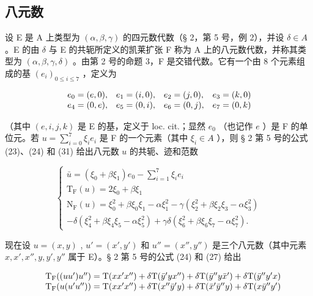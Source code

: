 \subsection{八元数}

设 E 是 A 上类型为 \((\alpha, \beta, \gamma)\) 的四元数代数（§ 2，第 5 号，例 2），并设 \(\delta \in A\) 。E 的由 \(\delta\) 与 E 的共轭所定义的凯莱扩张 F 称为 A 上的八元数代数，并称其类型为 \((\alpha, \beta, \gamma, \delta)\) 。由第 2 号的命题 3，F 是交错代数。它有一个由 8 个元素组成的基 \((e_{i})_{0 \leq i \leq 7}\) ，定义为

\[
\begin{array}{l l l l} e _ {0} = (e, 0), & e _ {1} = (i, 0), & e _ {2} = (j, 0), & e _ {3} = (k, 0) \\ e _ {4} = (0, e), & e _ {5} = (0, i), & e _ {6} = (0, j), & e _ {7} = (0, k) \end{array}
\]

（其中 \((e, i, j, k)\) 是 E 的基，定义于 loc. cit.；显然 \(e_0\) （也记作 \(e\) ）是 F 的单位元。若 \(u = \sum_{i=0}^{7} \xi_i e_i\) 是 F 的一个元素（其中 \(\xi_i \in A\) ），则 § 2 第 5 号的公式 (23)、(24) 和 (31) 给出八元数 \(u\) 的共轭、迹和范数

\[
\left\{ \begin{array}{c} \bar {u} = (\xi_ {0} + \beta \xi_ {1}) e _ {0} - \sum_ {i = 1} ^ {7} \xi_ {i} e _ {i} \\ \mathrm{T} _ {\mathrm{F}} (u) = 2 \xi_ {0} + \beta \xi_ {1} \\ \mathrm{N} _ {\mathrm{F}} (u) = \xi_ {0} ^ {2} + \beta \xi_ {0} \xi_ {1} - \alpha \xi_ {1} ^ {2} - \gamma (\xi_ {2} ^ {2} + \beta \xi_ {2} \xi_ {3} - \alpha \xi_ {3} ^ {2}) \\ - \delta (\xi_ {4} ^ {2} + \beta \xi_ {4} \xi_ {5} - \alpha \xi_ {5} ^ {2}) + \gamma \delta (\xi_ {6} ^ {2} + \beta \xi_ {6} \xi_ {7} - \alpha \xi_ {7} ^ {2}). \end{array} \right.\tag{4}
\]

现在设 \(u = (x, y)\) , \(u' = (x', y')\) 和 \(u'' = (x'', y'')\) 是三个八元数（其中元素 \(x, x', x'', y, y', y''\) 属于 E）。§ 2 第 5 号的公式 (24) 和 (27) 给出

\[
\begin{array}{r l} & {\mathrm{T} _ {\mathrm{F}} ((u u ^ {\prime}) u ^ {\prime \prime}) = \mathrm{T} (x x ^ {\prime} x ^ {\prime \prime}) + \delta \mathrm{T} (\bar {y} ^ {\prime} y x ^ {\prime \prime}) + \delta \mathrm{T} (\bar {y} ^ {\prime \prime} y \bar {x} ^ {\prime}) + \delta \mathrm{T} (\bar {y} ^ {\prime \prime} y ^ {\prime} x)} \\ & {\mathrm{T} _ {\mathrm{F}} (u (u ^ {\prime} u ^ {\prime \prime})) = \mathrm{T} (x x ^ {\prime} x ^ {\prime \prime}) + \delta \mathrm{T} (x ^ {\prime \prime} \bar {y} ^ {\prime} y) + \delta \mathrm{T} (\bar {x} ^ {\prime} \bar {y} ^ {\prime \prime} y) + \delta \mathrm{T} (x \bar {y} ^ {\prime \prime} y ^ {\prime})} \end{array}
\]

